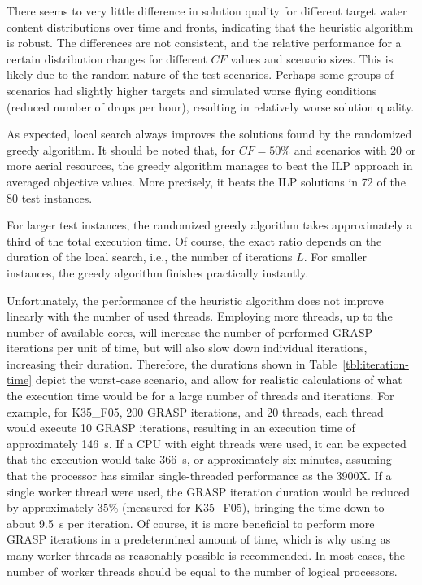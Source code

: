There seems to very little difference in solution quality for different target water content distributions over time and fronts, indicating that the heuristic algorithm is robust.
The differences are not consistent, and the relative performance for a certain distribution changes for different $\mathit{CF}$ values and scenario sizes.
This is likely due to the random nature of the test scenarios.
Perhaps some groups of scenarios had slightly higher targets and simulated worse flying conditions (reduced number of drops per hour), resulting in relatively worse solution quality.

As expected, local search always improves the solutions found by the randomized greedy algorithm.
It should be noted that, for $\mathit{CF} = 50\%$ and scenarios with 20 or more aerial resources, the greedy algorithm manages to beat the ILP approach in averaged objective values.
More precisely, it beats the ILP solutions in 72 of the 80 test instances.

For larger test instances, the randomized greedy algorithm takes approximately a third of the total execution time.
Of course, the exact ratio depends on the duration of the local search, i.e., the number of iterations $L$.
For smaller instances, the greedy algorithm finishes practically instantly.

Unfortunately, the performance of the heuristic algorithm does not improve linearly with the number of used threads.
Employing more threads, up to the number of available cores, will increase the number of performed GRASP iterations per unit of time, but will also slow down individual iterations, increasing their duration.
Therefore, the durations shown in Table~\ref{tbl:iteration-time} depict the worst-case scenario, and allow for realistic calculations of what the execution time would be for a large number of threads and iterations.
For example, for K35\_F05, 200 GRASP iterations, and 20 threads, each thread would execute 10 GRASP iterations, resulting in an execution time of approximately \SI{146}{\second}.
If a CPU with eight threads were used, it can be expected that the execution would take \SI{366}{\second}, or approximately six minutes, assuming that the processor has similar single-threaded performance as the 3900X.
If a single worker thread were used, the GRASP iteration duration would be reduced by approximately $35\%$ (measured for K35\_F05), bringing the time down to about \SI{9.5}{\second} per iteration.
Of course, it is more beneficial to perform more GRASP iterations in a predetermined amount of time, which is why using as many worker threads as reasonably possible is recommended.
In most cases, the number of worker threads should be equal to the number of logical processors.

